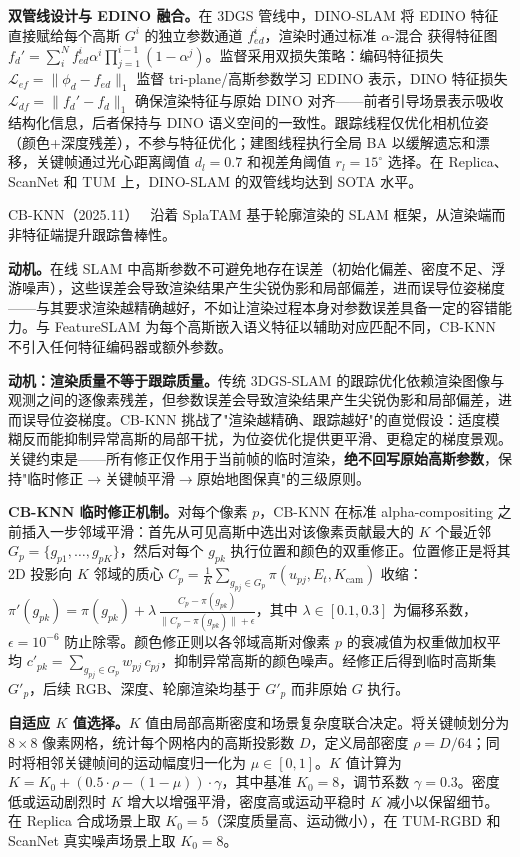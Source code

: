 \textbf{双管线设计与 EDINO 融合。}在 3DGS 管线中，DINO-SLAM 将 EDINO 特征直接赋给每个高斯 $G^i$ 的独立参数通道 $f_{ed}^i$，渲染时通过标准 $\alpha$-混合 获得特征图 $f_d' = \sum_i^N f_{ed}^i \alpha^i \prod_{j=1}^{i-1}(1-\alpha^j)$。监督采用双损失策略：编码特征损失 $\mathcal{L}_{ef} = \|\phi_d - f_{ed}\|_1$ 监督 tri-plane/高斯参数学习 EDINO 表示，DINO 特征损失 $\mathcal{L}_{df} = \|f_d' - f_d\|_1$ 确保渲染特征与原始 DINO 对齐——前者引导场景表示吸收结构化信息，后者保持与 DINO 语义空间的一致性。跟踪线程仅优化相机位姿（颜色+深度残差），不参与特征优化；建图线程执行全局 BA 以缓解遗忘和漂移，关键帧通过光心距离阈值 $d_l{=}0.7$ 和视差角阈值 $r_l{=}15^\circ$ 选择。在 Replica、ScanNet 和 TUM 上，DINO-SLAM 的双管线均达到 SOTA 水平。

CB-KNN（2025.11）~\cite{2511_23221} 沿着 SplaTAM 基于轮廓渲染的 SLAM 框架，从渲染端而非特征端提升跟踪鲁棒性。

\textbf{动机。}在线 SLAM 中高斯参数不可避免地存在误差（初始化偏差、密度不足、浮游噪声），这些误差会导致渲染结果产生尖锐伪影和局部偏差，进而误导位姿梯度——与其要求渲染越精确越好，不如让渲染过程本身对参数误差具备一定的容错能力。与 FeatureSLAM 为每个高斯嵌入语义特征以辅助对应匹配不同，CB-KNN 不引入任何特征编码器或额外参数。

\textbf{动机：渲染质量不等于跟踪质量。}传统 3DGS-SLAM 的跟踪优化依赖渲染图像与观测之间的逐像素残差，但参数误差会导致渲染结果产生尖锐伪影和局部偏差，进而误导位姿梯度。CB-KNN 挑战了"渲染越精确、跟踪越好"的直觉假设：适度模糊反而能抑制异常高斯的局部干扰，为位姿优化提供更平滑、更稳定的梯度景观。关键约束是——所有修正仅作用于当前帧的临时渲染，\textbf{绝不回写原始高斯参数}，保持"临时修正$\to$关键帧平滑$\to$原始地图保真"的三级原则。

\textbf{CB-KNN 临时修正机制。}对每个像素 $p$，CB-KNN 在标准 alpha-compositing 之前插入一步邻域平滑：首先从可见高斯中选出对该像素贡献最大的 $K$ 个最近邻 $G_p = \{g_{p1}, \ldots, g_{pK}\}$，然后对每个 $g_{pk}$ 执行位置和颜色的双重修正。位置修正是将其 2D 投影向 $K$ 邻域的质心 $C_p = \frac{1}{K}\sum_{g_{pj} \in G_p} \pi(u_{pj}, E_t, K_\text{cam})$ 收缩：$\pi'(g_{pk}) = \pi(g_{pk}) + \lambda\,\frac{C_p - \pi(g_{pk})}{\|C_p - \pi(g_{pk})\| + \epsilon}$，其中 $\lambda \in [0.1, 0.3]$ 为偏移系数，$\epsilon = 10^{-6}$ 防止除零。颜色修正则以各邻域高斯对像素 $p$ 的衰减值为权重做加权平均 $c'_{pk} = \sum_{g_{pj} \in G_p} w_{pj}\, c_{pj}$，抑制异常高斯的颜色噪声。经修正后得到临时高斯集 $G'_p$，后续 RGB、深度、轮廓渲染均基于 $G'_p$ 而非原始 $G$ 执行。

\textbf{自适应 $K$ 值选择。}$K$ 值由局部高斯密度和场景复杂度联合决定。将关键帧划分为 $8{\times}8$ 像素网格，统计每个网格内的高斯投影数 $D$，定义局部密度 $\rho = D/64$；同时将相邻关键帧间的运动幅度归一化为 $\mu \in [0,1]$。$K$ 值计算为 $K = K_0 + (0.5 \cdot \rho - (1 - \mu)) \cdot \gamma$，其中基准 $K_0 = 8$，调节系数 $\gamma = 0.3$。密度低或运动剧烈时 $K$ 增大以增强平滑，密度高或运动平稳时 $K$ 减小以保留细节。在 Replica 合成场景上取 $K_0 = 5$（深度质量高、运动微小），在 TUM-RGBD 和 ScanNet 真实噪声场景上取 $K_0 = 8$。

